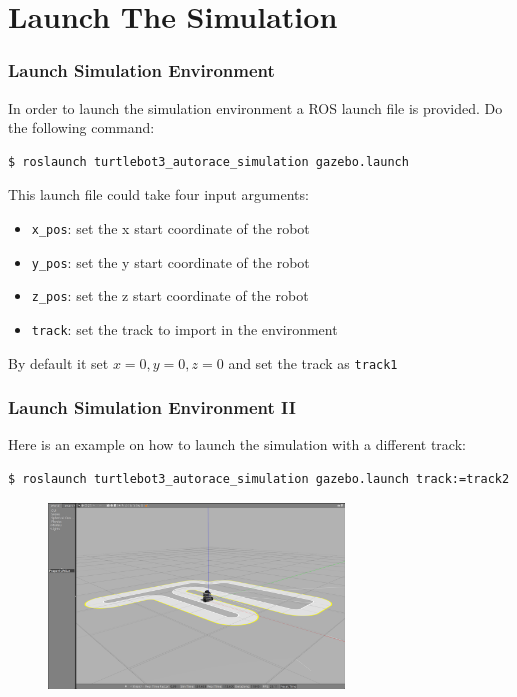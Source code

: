 \section{Launch The Simulation}

\begin{frame}[fragile]
	\frametitle{Launch Simulation Environment}
	In order to launch the simulation environment a ROS launch file is provided. Do the following command:
\begin{lstlisting}[language=bash]
$ roslaunch turtlebot3_autorace_simulation gazebo.launch
\end{lstlisting}

This launch file could take four input arguments:
\begin{itemize}
	\item \texttt{x\_pos}: set the x start coordinate of the robot
	\item \texttt{y\_pos}: set the y start coordinate of the robot
	\item \texttt{z\_pos}: set the z start coordinate of the robot
	\item \texttt{track}: set the track to import in the environment
\end{itemize}
By default it set $x = 0, y = 0, z = 0$ and set the track as \texttt{track1}
\end{frame}

\begin{frame}[fragile]
\frametitle{Launch Simulation Environment II}
Here is an example on how to launch the simulation with a different track:
\begin{lstlisting}[language=bash]
$ roslaunch turtlebot3_autorace_simulation gazebo.launch track:=track2
\end{lstlisting}
\begin{figure}
	\includegraphics[width=0.7\textwidth]{figures/png/gazebo}
\end{figure}
\end{frame}

